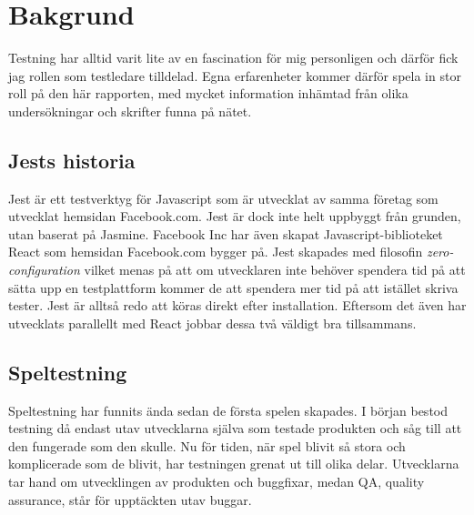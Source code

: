 \section{Bakgrund}
\label{sec:david-background}
Testning har alltid varit lite av en fascination för mig personligen och därför fick jag rollen som testledare tilldelad. Egna erfarenheter kommer därför spela in stor roll på den här rapporten, med mycket information inhämtad från olika undersökningar och skrifter funna på nätet.

\subsection{Jests historia}
Jest är ett testverktyg för Javascript som är utvecklat av samma företag som utvecklat hemsidan Facebook.com. Jest är dock inte helt uppbyggt från grunden, utan baserat på Jasmine. Facebook Inc har även skapat Javascript-biblioteket React\cite{bib-react} som hemsidan Facebook.com bygger på. Jest skapades med filosofin \textit{zero-configuration} vilket menas på att om utvecklaren inte behöver spendera tid på att sätta upp en testplattform kommer de att spendera mer tid på att istället skriva tester. Jest är alltså redo att köras direkt efter installation. Eftersom det även har utvecklats parallellt med React jobbar dessa två väldigt bra tillsammans.

\subsection{Speltestning}
Speltestning har funnits ända sedan de första spelen skapades. I början bestod testning då endast utav utvecklarna själva som testade produkten och såg till att den fungerade som den skulle. Nu för tiden, när spel blivit så stora och komplicerade som de blivit, har testningen grenat ut till olika delar. Utvecklarna tar hand om utvecklingen av produkten och buggfixar, medan QA, quality assurance, står för upptäckten utav buggar\cite{bib-quality-assured}. 
